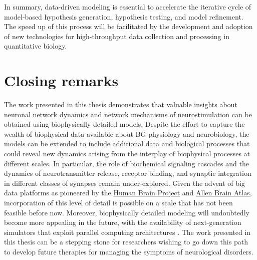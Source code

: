 In summary, data-driven modeling is essential to accelerate the iterative cycle of
model-based hypothesis generation, hypothesis testing, and model refinement.
The speed up of this process will be facilitated by the development and adoption
of new technologies for high-throughput data collection and processing in quantitative biology.

\section{Closing remarks}
%
%
%
%
%
%

The work presented in this thesis demonstrates that valuable insights about neuronal
network dynamics and network mechanisms of neurostimulation can be obtained
using biophysically detailed models. Despite the effort to capture the wealth of
biophysical data available about BG physiology and neurobiology, the models
can be extended to include additional data and biological processes that could
reveal new dynamics arising from the interplay of biophysical processes at different scales.
In particular, the role of biochemical signaling cascades and the dynamics of
neurotransmitter release, receptor binding, and synaptic integration in different
classes of synapses remain under-explored.
%
Given the  advent of big data platforms as pioneered by the
\href{https://www.humanbrainproject.eu}{Human Brain Project} and
\href{https://portal.brain-map.org/}{Allen Brain Atlas}, incorporation of this
level of detail is possible on a scale that has not been feasible before now.
Moreover, biophysically detailed modeling will undoubtedly become more appealing
in the future, with the availability of next-generation simulators
that exploit parallel computing architectures \cite{akar_arbor_2019,kumbhar_coreneuron_2019}.
The work presented in this thesis can be a stepping stone for researchers wishing to
go down this path to develop future therapies for managing the symptoms of neurological disorders.

%
%
%
%
%
%
%
